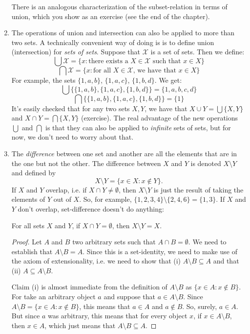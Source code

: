 \begin{enumerate}[\thesection.1]
There is an analogous characterization of the subset-relation in terms of union, which you show as an exercise (see the end of the chapter).

\item The operations of union and intersection can also be applied to more than two sets. A technically convenient way of doing is is to define union (intersection) for \emph{sets of sets}. Suppose that $\mathcal{X}$ is a set of sets. Then we define:
\[\bigcup\mathcal{X}=\{x: \text{there exists a }X\in\mathcal{X}\text{ such that }x\in X\}\]
\[\bigcap\mathcal{X}=\{x: \text{for all }X\in\mathcal{X}\text{, we have that }x\in X\}\]
For example, the sets $\{1,a,b\}$, $\{1,a,c\}$, $\{1,b,d\}$. We get:
\[\bigcup\{\{1,a,b\}, \{1,a,c\},\{1,b,d\}\}=\{1,a,b,c,d\}\]
\[\bigcap\{\{1,a,b\}, \{1,a,c\},\{1,b,d\}\}=\{1\}\]
It's easily checked that for any two sets $X,Y$, we have that $X\cup Y=\bigcup \{X,Y\}$ and $X\cap Y=\bigcap \{X,Y\}$ (exercise). The real advantage of the new operations $\bigcup$ and $\bigcap$ is that they can also be applied to \emph{infinite} sets of sets, but for now, we don't need to worry about that.

\item The \emph{difference} between one set and another are all the elements that are in the one but not the other. The difference between $X$ and $Y$ is denoted $X\setminus Y$ and defined by \[X\setminus Y=\{x\in X:x\notin Y\}.\] If $X$ and $Y$ overlap, i.e. if $X\cap Y\neq \emptyset$, then $X\setminus Y$ is just the result of taking the elements of $Y$ out of $X$. So, for example, $\{1,2,3,4\}\setminus \{2,4,6\}=\{1,3\}$. If $X$ and $Y$ don't overlap, set-difference doesn't do anything:
\begin{proposition}
For all sets $X$ and $Y$, if $X\cap Y=\emptyset$, then $X\setminus Y=X$.
\end{proposition}
\begin{proof}
Let $A$ and $B$ two arbitrary sets such that $A\cap B=\emptyset$. We need to establish that $A\setminus B=A$. Since this is a set-identity, we need to make use of the axiom of extensionality, i.e. we need to show that (i) $A\setminus B\subseteq A$ and that (ii) $A\subseteq A\setminus B$.

Claim (i) is almost immediate from the definition of $A\setminus B$ as $\{x\in A: x\notin B\}$. For take an arbitrary object $a$ and suppose that  $a \in A\setminus B$. Since $A\setminus B=\{x\in A: x\notin B\}$, this means that $a\in A$ and $a\notin B$. So, surely, $a\in A$. But since $a$ was arbitrary, this means that for every object $x$, if $x\in A\setminus B$, then $x\in A$, which just means that $A\setminus B\subseteq A$.


\end{proof}
\end{enumerate}
